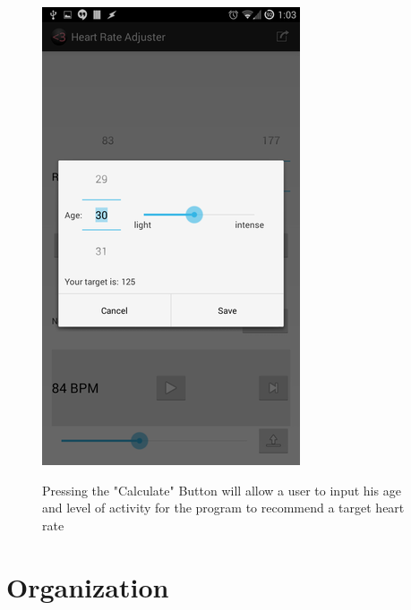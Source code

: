 \documentclass[letterpaper,english, 12pt]{scrreprt}
\begin{document}
\begin{figure}[H]
	\centering
	\includegraphics{img/mobile_ui/6.png}\\
	\caption{Pressing the "Calculate" Button will allow a user to input his age and level of activity for the program to recommend a target heart rate}
\end{figure}

\section{Organization}
\end{document}

